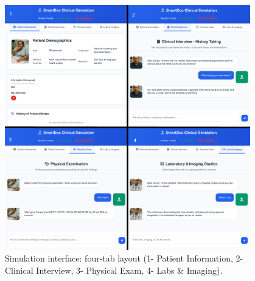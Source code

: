 \begin{figure}[h]
  \centering
  \includegraphics[width=0.95\textwidth]{figures/ui/ui_layout_overview.png}
  \caption{Simulation interface: four-tab layout (1- Patient Information, 2- Clinical Interview, 3- Physical Exam, 4- Labs \& Imaging).}
  \label{fig:ui-layout}
\end{figure}

